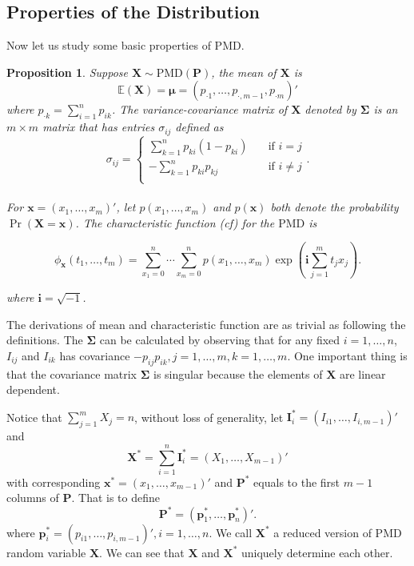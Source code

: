 \documentclass[12pt]{article}
\newcommand{\Ivec}{{\boldsymbol{I}}}
\newcommand{\EE}{\mathbb{E}}
\newcommand{\Xmat}{\mathbf{X}}
\newcommand{\Pmat}{\mathbf{P}}
\newcommand{\pvec}{\boldsymbol{p}}
\newcommand{\ivec}{{\boldsymbol{i}}}
\newcommand{\PMD}{\textrm{PMD}}
\newcommand{\Xvec}{\boldsymbol{X}}
\newcommand{\xvec}{\boldsymbol{x}}
\newcommand{\muvec}{\boldsymbol{\mu}}
\newcommand{\Sig}{\boldsymbol{\Sigma}}
\newcommand{\qedw}{\hfill \ensuremath{\Box}}
\newtheorem{ppt}{Proposition}
\begin{document}
\subsection{Properties of the Distribution}
Now let us study some basic properties of $\PMD$.

\begin{ppt}%
Suppose $\Xmat \sim \PMD (\Pmat)$, the mean of $\Xmat$ is
   $$\EE(\Xmat) = \muvec = \left( p_{\cdot1} ,\dots,p_{\cdot,m-1},p_{\cdot m}\right)'$$ where $p_{\cdot k} = \sum_{i=1}^{n}p_{i k}$.
The variance-covariance matrix of $\Xvec$ denoted by $\Sig$ is an $m \times m$ matrix that has entries $\sigma_{ij}$ defined as
\begin{equation*}
   \sigma_{ij} =
           \begin{cases}
             \sum_{k=1}^{n}p_{ki}(1-p_{ki}) & \quad \text{if } i=j\\
             -\sum_{k=1}^{n}p_{ki}p_{kj} & \quad \text{if } i \neq j\\
           \end{cases}.
\end{equation*}\\
For $\xvec = (x_1, \dots, x_m)'$, let $p(x_1,\ldots,x_{m})$ and $p(\xvec)$ both denote the probability $\Pr \left(\Xvec = \xvec \right)$. The characteristic function (cf) for the $\PMD$ is

\begin{equation*}
\phi_{\xvec}(t_1, \dots, t_{m})  =  \sum_{x_1 = 0}^{n} \cdots \sum_{x_{m} = 0}^n p(x_1,\ldots,x_{m})\exp\left(\ivec\sum_{j=1}^{m}t_jx_j\right).
\end{equation*}

where  $\ivec=\sqrt{-1}$.
\end{ppt}
The derivations of mean and characteristic function are as trivial as following the definitions. The $\Sig$ can be calculated by observing that for any fixed $i=1,\dots,n$, $I_{ij}$ and $I_{ik}$ has covariance $-p_{ij}p_{ik},j=1,\dots,m,k=1,\dots,m$. One important thing is that the covariance matrix $\Sig$ is singular because the elements of $\Xvec$ are linear dependent.

Notice that $\sum_{j=1}^{m}X_j = n$, without loss of generality, let $\Ivec_i^{\ast} = (I_{i1},\dots,I_{i,m-1})'$ and
 $$\Xvec^{\ast}=\sum_{i=1}^{n}\Ivec_{i}^{\ast}=(X_1,\dots,X_{m-1})'$$
  with corresponding $\xvec^{\ast} = (x_1,\dots,x_{m-1})'$ and $\Pmat^{\ast}$ equals to the first $m-1$ columns of $\Pmat$. That is to define
$$
\Pmat^{\ast} = \left(\pvec_1^{\ast},\dots, \pvec_n^{\ast} \right)'.
$$
where $\pvec_{i}^{\ast} = \left(p_{i1},\dots,p_{i,m-1} \right)', i = 1,\dots,n$. We call $\Xvec^{\ast}$ a reduced version of $\PMD$ random variable $\Xvec$. We can see that $\Xvec$ and $\Xvec^{\ast}$ uniquely determine each other.
\end{document}
